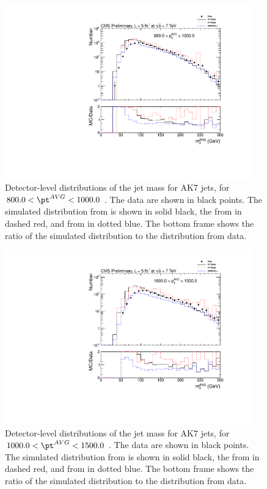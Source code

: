 \begin{figure}[htbp]
\centering
\includegraphics[width=0.95\textwidth]{figs/histAK7MjetVsPtAvg_rawDataMCComparisons_pt_9}
\caption{Detector-level distributions of the jet mass for AK7 jets,
for $800.0 < \pt^{AVG} < 1000.0$ \GeVc. The data are shown in black points.
The simulated distribution from \PYTHIA is shown in solid black, 
the from \PYTHIAEIGHT in dashed red, and from \HERWIG in dotted blue. 
The bottom frame shows the ratio of the simulated distribution
to the distribution from data. 
\label{figs:histAK7MjetVsPtAvg_rawDataMCComparisons_pt_9}}
\end{figure}



\begin{figure}[htbp]
\centering
\includegraphics[width=0.95\textwidth]{figs/histAK7MjetVsPtAvg_rawDataMCComparisons_pt_10}
\caption{Detector-level distributions of the jet mass for AK7 jets,
for $1000.0 < \pt^{AVG} < 1500.0$ \GeVc. The data are shown in black points.
The simulated distribution from \PYTHIA is shown in solid black, 
the from \PYTHIAEIGHT in dashed red, and from \HERWIG in dotted blue. 
The bottom frame shows the ratio of the simulated distribution
to the distribution from data. 
\label{figs:histAK7MjetVsPtAvg_rawDataMCComparisons_pt_10}}
\end{figure}

